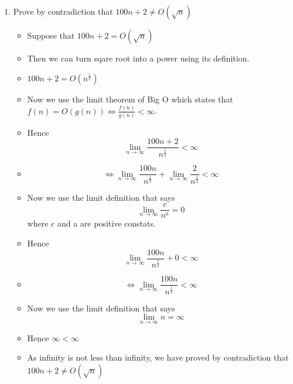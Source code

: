 \begin{enumerate}
\item Prove by contradiction that $100n+2\neq O(\sqrt{n})$
  \begin{itemize}
  \item Suppose that $100n+2 = O(\sqrt{n})$
  \item [] Then we can turn sqare root into a power using its definition.
  \item [] {\Large $100n+2 = O(n^{\frac{1}{2}})$}
    \item [] Now we use the limit theorem of Big O which states that $f(n)=O(g(n)) \Leftrightarrow \frac{f(n)}{g(n)} < \infty$.
  \item [] Hence {\Large $$\lim_{n \to \infty} \frac{100n+2}{n^{\frac{1}{2}}} < \infty$$}
  \item [] {\Large $$\Leftrightarrow \lim_{n \to \infty} \frac{100n}{n^{\frac{1}{2}}} + \lim_{n \to \infty} \frac{2}{n^{\frac{1}{2}}} < \infty$$}
  \item [] Now we use the limit definition that says {\Large $$\lim_{n \to \infty} \frac{c}{n^{a}} =0$$} where c and a are positive constats.
  \item [] Hence {\Large $$\lim_{n \to \infty} \frac{100n}{n^{\frac{1}{2}}} + 0 < \infty$$}
  \item [] {\Large $$\Leftrightarrow \lim_{n \to \infty} \frac{100n}{n^{\frac{1}{2}}} < \infty$$}
  \item [] Now we use the limit definition that says {\large $$\lim_{n \to \infty} n = \infty$$}
  \item [] Hence $\infty < \infty$
  \item As infinity is not less than infinity, we have proved by contradiction that $100n+2 \neq O(\sqrt{n})$
  \end{itemize}
\end{enumerate}
